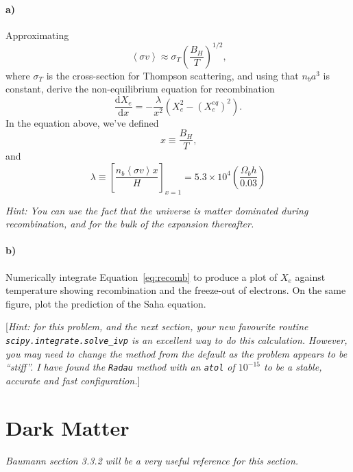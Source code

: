 \documentclass[12pt]{article}
\newcommand\diff{\mathrm{d}}
\begin{document}
\paragraph{a)} Approximating
\begin{equation}
    \left<\sigma v\right> \approx \sigma_T \left(\frac{B_H}{T}\right)^{1/2} \text{,}
\end{equation}
where $\sigma_T$ is the cross-section for Thompson scattering, and using that
$n_b a^3$ is constant, derive the non-equilibrium equation for recombination
\begin{equation}
    \frac{\diff X_e}{\diff x} = -\frac{\lambda}{x^2}
    \left(X_e^2 - (X_e^{eq})^2\right) \text{.}
    \label{eq:recomb}
\end{equation}
In the equation above, we've defined
\begin{equation}
    x \equiv \frac{B_H}{T} \text{,}
\end{equation}
and
\begin{equation}
    \lambda \equiv \left[\frac{n_b\left<\sigma v\right> x}{H}\right]_{x=1}
    = 5.3 \times 10^4 \left(\frac{\Omega_b h}{0.03}\right)
\end{equation}

\emph{Hint: You can use the fact that the universe is matter dominated during recombination, and for the bulk of the expansion thereafter.}

\paragraph{b)} Numerically integrate Equation~\ref{eq:recomb} to produce a plot
of $X_e$ against temperature showing recombination and the freeze-out of
electrons. On the same figure, plot the prediction of the Saha equation.

[\emph{Hint: for this problem, and the next section, your new favourite routine \texttt{scipy.integrate.solve\_ivp} is an excellent way to do this calculation. However, you may need to change the method from the default as the problem appears to be ``stiff''. I have found the \texttt{Radau} method with an \texttt{atol} of $10^{-15}$ to be a stable, accurate and fast configuration.}]


\section{Dark Matter}

\emph{Baumann section 3.3.2 will be a very useful reference for this section.}
\newcommand{\sigv}{\langle \sigma v \rangle}
\end{document}

